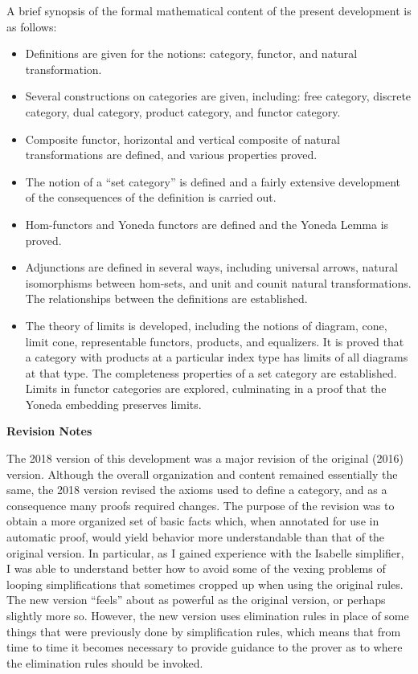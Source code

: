 \documentclass[11pt,notitlepage,a4paper]{report}
\begin{document}
A brief synopsis of the formal mathematical content of the present development is as follows:
\begin{itemize}
\item  Definitions are given for the notions: category, functor, and natural transformation.
\item  Several constructions on categories are given, including: free category,
  discrete category, dual category, product category, and functor category.
\item  Composite functor, horizontal and vertical composite of natural transformations
  are defined, and various properties proved.
\item  The notion of a ``set category'' is defined and a fairly extensive development
  of the consequences of the definition is carried out.
\item  Hom-functors and Yoneda functors are defined and the Yoneda Lemma is proved.
\item  Adjunctions are defined in several ways, including universal arrows,
  natural isomorphisms between hom-sets, and unit and counit natural transformations.
  The relationships between the definitions are established.
\item  The theory of limits is developed, including the notions of diagram, cone, limit cone,
  representable functors, products, and equalizers.  It is proved that a category with
  products at a particular index type has limits of all diagrams at that type.
  The completeness properties of a set category are established.
  Limits in functor categories are explored, culminating in a proof that the Yoneda
  embedding preserves limits.
\end{itemize}

\medskip\par\noindent
{\bf Revision Notes}

The 2018 version of this development was a major revision of the original (2016)
version.  Although the overall organization and content remained essentially the same,
the 2018 version revised the axioms used to define a category, and as a consequence
many proofs required changes.  The purpose of the revision was to obtain a more organized
set of basic facts which, when annotated for use in automatic proof, would yield behavior more
understandable than that of the original version.  In particular, as I gained experience with
the Isabelle simplifier, I was able to understand better how to avoid some of the vexing
problems of looping simplifications that sometimes cropped up when using the original rules.
The new version ``feels'' about as powerful as the original version, or perhaps slightly more so.
However, the new version uses elimination rules in place of some things that were previously
done by simplification rules, which means that from time to time it becomes necessary
to provide guidance to the prover as to where the elimination rules should be invoked.
\end{document}
